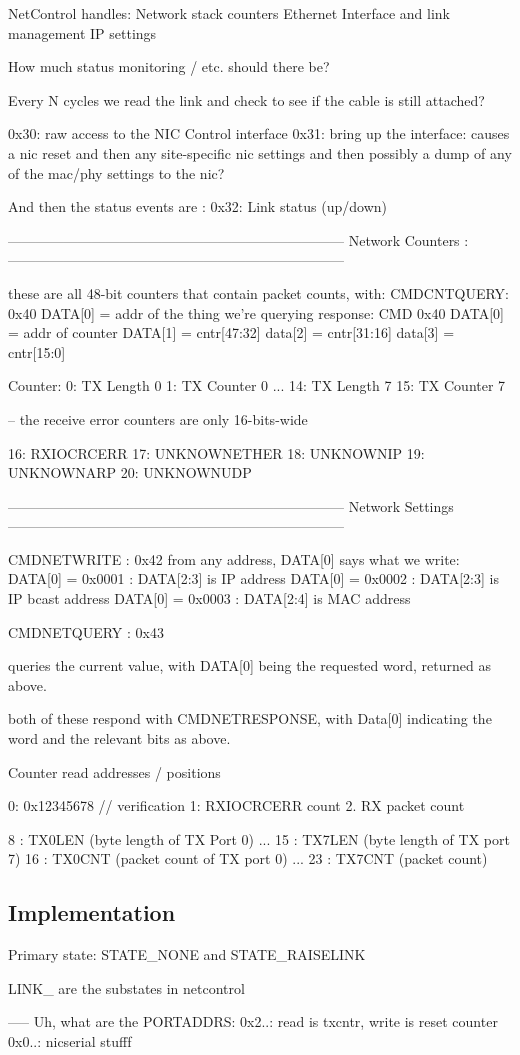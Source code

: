 NetControl handles: 
   Network stack counters
   Ethernet Interface and link management
   IP settings


How much status monitoring / etc. should there be? 

Every N cycles we read the link and check to see if the cable
is still attached? 

0x30: raw access to the NIC Control interface
0x31: bring up the interface:
    causes a nic reset
    and then any site-specific nic settings
    and then possibly a dump of any of the mac/phy settings to the nic? 

And then the status events are : 
0x32: Link status (up/down)


------------------------------------------------------------------------
Network Counters : 
------------------------------------------------------------------------

these are all 48-bit counters that contain packet counts, with: 
CMDCNTQUERY: 0x40
DATA[0] = addr of the thing we're querying
response: CMD 0x40
DATA[0] = addr of counter
DATA[1] = cntr[47:32]
data[2] = cntr[31:16]
data[3] = cntr[15:0]

Counter: 
0: TX Length 0
1: TX Counter 0 
...
14: TX Length 7
15: TX Counter 7 

-- the receive error counters are only 16-bits-wide

16: RXIOCRCERR
17: UNKNOWNETHER
18: UNKNOWNIP
19: UNKNOWNARP
20: UNKNOWNUDP


------------------------------------------------------------------------
Network Settings
------------------------------------------------------------------------

CMDNETWRITE : 0x42
from any address, DATA[0] says what we write:
    DATA[0] = 0x0001 : DATA[2:3] is IP address
    DATA[0] = 0x0002 : DATA[2:3] is IP bcast address
    DATA[0] = 0x0003 : DATA[2:4] is MAC address

CMDNETQUERY : 0x43

queries the current value, with DATA[0] being the requested word,
returned as above.

both of these respond with CMDNETRESPONSE, with Data[0] indicating
the word and the relevant bits as above. 

Counter read addresses / positions

0: 0x12345678 // verification
1: RXIOCRCERR count
2. RX packet count

8 : TX0LEN (byte length of TX Port 0)
...
15 : TX7LEN (byte length of TX port 7)
16 : TX0CNT (packet count of TX port 0)
...
23 : TX7CNT (packet count)


\subsection{Implementation}

Primary state: STATE_NONE and STATE_RAISELINK

LINK_ are the substates in netcontrol



----- 
Uh, what are the PORTADDRS: 
0x2..: read is txcntr, write is reset counter
0x0..: nicserial stufff

